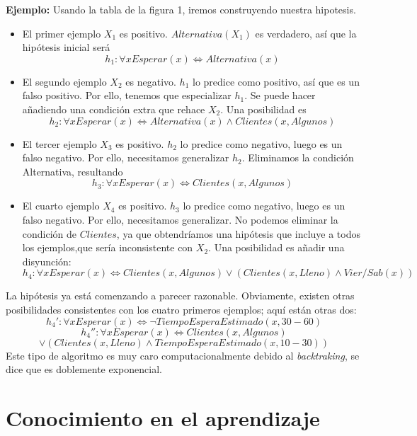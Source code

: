 \documentclass[12 pt, a4paper]{article}
\begin{document}
			\textbf{Ejemplo:} Usando la tabla de la figura 1, iremos construyendo nuestra hipotesis.
			\begin{itemize}
				\item El primer ejemplo $X_{1}$ es positivo. $Alternativa(X_{1})$ es verdadero, así que la hipótesis inicial será
					$$h_{1}: \forall x Esperar(x) \Leftrightarrow Alternativa(x)$$
				\item El segundo ejemplo $X_{2}$ es negativo. $h_{1}$ lo predice como positivo, así que es un falso positivo. Por ello, tenemos que especializar $h_{1}$. Se puede hacer añadiendo una condición extra que rehace $X_{2}$. Una posibilidad es
					$$h_{2}: \forall x Esperar(x) \Leftrightarrow Alternativa(x) \land Clientes(x, Algunos)$$
				\item  El tercer ejemplo $X_{3}$ es positivo. $h_{2}$ lo predice como negativo, luego es un falso negativo. Por ello, necesitamos generalizar $h_{2}$. Eliminamos la condición Alternativa, resultando
					$$h_{3}:\forall x Esperar(x) \Leftrightarrow Clientes(x, Algunos)$$
				\item El cuarto ejemplo $X_{4}$ es positivo. $h_{3}$ lo predice como negativo, luego es un falso negativo. Por ello, necesitamos generalizar. No podemos eliminar la condición de $Clientes$, ya que obtendríamos una hipótesis que incluye a todos los ejemplos,que sería inconsistente con $X_{2}$. Una posibilidad es añadir una disyunción:
					$$h_{4}:\forall x Esperar(x) \Leftrightarrow Clientes(x, Algunos)\lor (Clientes(x, Lleno) \land Vier/Sab(x))$$
			\end{itemize}
				
				La hipótesis ya está comenzando a parecer razonable. Obviamente, existen otras posibilidades consistentes con los cuatro primeros ejemplos; aquí están otras dos:
					$$h_{4}':\forall x Esperar(x) \Leftrightarrow \neg TiempoEsperaEstimado(x, 30-60)$$
					$$h_{4}'':\forall x Esperar(x) \Leftrightarrow Clientes(x, Algunos)$$ 
					$$\lor (Clientes(x, Lleno) \land TiempoEsperaEstimado(x, 10-30))$$
			Este tipo de algoritmo es muy caro computacionalmente debido al \emph{backtraking}, se dice que es doblemente exponencial.
			
			
	\section{Conocimiento en el aprendizaje}
\end{document}
